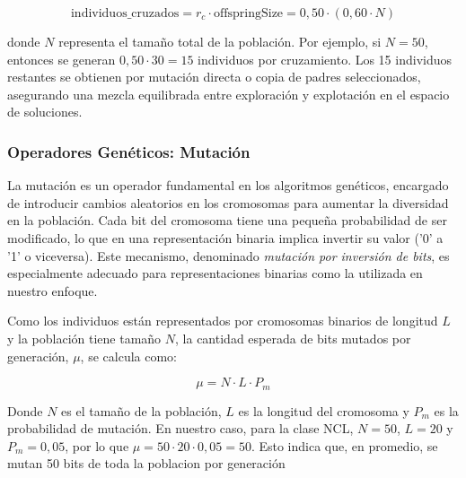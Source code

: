 \begin{equation}
\text{individuos\_cruzados} = r_c \cdot \text{offspringSize} = 0,50 \cdot \left(0,60 \cdot N\right)
\end{equation}

donde \( N \) representa el tamaño total de la población.  
Por ejemplo, si \( N = 50 \), entonces se generan \( 0{,}50 \cdot 30 = 15 \) individuos por cruzamiento.  
Los 15 individuos restantes se obtienen por mutación directa o copia de padres seleccionados, asegurando una mezcla equilibrada entre exploración y explotación en el espacio de soluciones.

\subsubsection{Operadores Genéticos: Mutación}

La mutación es un operador fundamental en los algoritmos genéticos, encargado de introducir cambios aleatorios en los cromosomas para aumentar la diversidad en la población.  
Cada bit del cromosoma tiene una pequeña probabilidad de ser modificado, lo que en una representación binaria implica invertir su valor ('0' a '1' o viceversa).  
Este mecanismo, denominado \emph{mutación por inversión de bits}, es especialmente adecuado para representaciones binarias como la utilizada en nuestro enfoque. 

Como los individuos están representados por cromosomas binarios de longitud $L$ y la población tiene tamaño $N$,  
la cantidad esperada de bits mutados por generación, $\mu$, se calcula como:

\[
\mu = N \cdot L \cdot P_m
\]

Donde $N$ es el tamaño de la población, $L$ es la longitud del cromosoma y $P_m$ es la probabilidad de mutación.
En nuestro caso, para la clase NCL, $N = 50$, $L = 20$ y $P_m = 0,05$, por lo que $\mu = 50 \cdot 20 \cdot 0,05 = 50$.
Esto indica que, en promedio, se mutan 50 bits de toda la poblacion por generación

